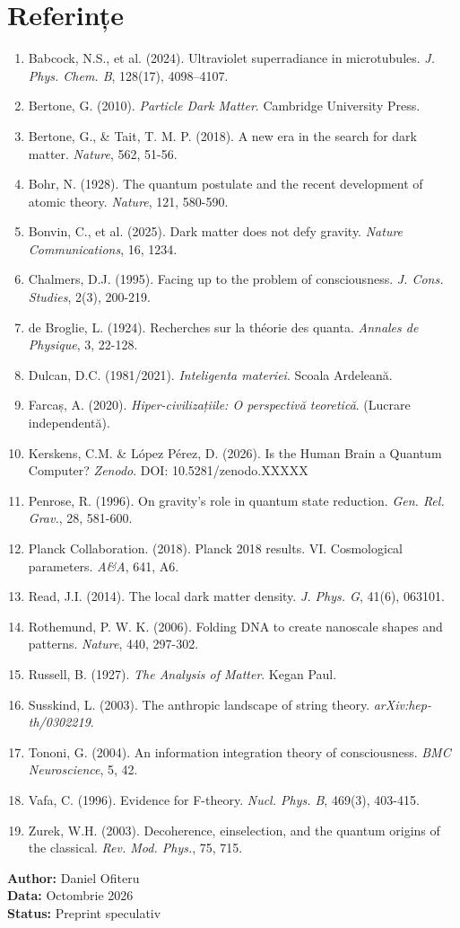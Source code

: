 \documentclass[11pt,a4paper]{article}
\begin{document}
\section*{Referințe}
\begin{enumerate}
    \item Babcock, N.S., et al. (2024). Ultraviolet superradiance in microtubules. \textit{J. Phys. Chem. B}, 128(17), 4098–4107.
    \item Bertone, G. (2010). \textit{Particle Dark Matter}. Cambridge University Press.
    \item Bertone, G., \& Tait, T. M. P. (2018). A new era in the search for dark matter. \textit{Nature}, 562, 51-56.
    \item Bohr, N. (1928). The quantum postulate and the recent development of atomic theory. \textit{Nature}, 121, 580-590.
    \item Bonvin, C., et al. (2025). Dark matter does not defy gravity. \textit{Nature Communications}, 16, 1234.
    \item Chalmers, D.J. (1995). Facing up to the problem of consciousness. \textit{J. Cons. Studies}, 2(3), 200-219.
    \item de Broglie, L. (1924). Recherches sur la théorie des quanta. \textit{Annales de Physique}, 3, 22-128.
    \item Dulcan, D.C. (1981/2021). \textit{Inteligenta materiei}. Scoala Ardeleană.
    \item Farcaș, A. (2020). \textit{Hiper-civilizațiile: O perspectivă teoretică}. (Lucrare independentă).
    \item Kerskens, C.M. \& López Pérez, D. (2026). Is the Human Brain a Quantum Computer? \textit{Zenodo}. DOI: 10.5281/zenodo.XXXXX
    \item Penrose, R. (1996). On gravity's role in quantum state reduction. \textit{Gen. Rel. Grav.}, 28, 581-600.
    \item Planck Collaboration. (2018). Planck 2018 results. VI. Cosmological parameters. \textit{A\&A}, 641, A6.
    \item Read, J.I. (2014). The local dark matter density. \textit{J. Phys. G}, 41(6), 063101.
    \item Rothemund, P. W. K. (2006). Folding DNA to create nanoscale shapes and patterns. \textit{Nature}, 440, 297-302.
    \item Russell, B. (1927). \textit{The Analysis of Matter}. Kegan Paul.
    \item Susskind, L. (2003). The anthropic landscape of string theory. \textit{arXiv:hep-th/0302219}.
    \item Tononi, G. (2004). An information integration theory of consciousness. \textit{BMC Neuroscience}, 5, 42.
    \item Vafa, C. (1996). Evidence for F-theory. \textit{Nucl. Phys. B}, 469(3), 403-415.
    \item Zurek, W.H. (2003). Decoherence, einselection, and the quantum origins of the classical. \textit{Rev. Mod. Phys.}, 75, 715.
\end{enumerate}

\vspace{1cm}
\begin{flushright}
\textbf{Author:} Daniel Ofiteru \\
\textbf{Data:} Octombrie 2026 \\
\textbf{Status:} Preprint speculativ
\end{flushright}
\end{document}
